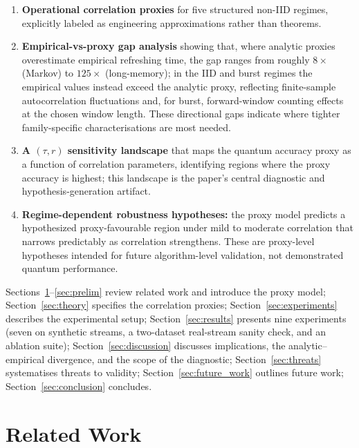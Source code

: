 \documentclass[sensors,article,submit,pdftex,moreauthors]{Definitions/mdpi}
\begin{document}
\begin{enumerate}
    \item \textbf{Operational correlation proxies} for five structured non\nobreakdash-IID regimes, explicitly labeled as engineering approximations rather than theorems.

    \item \textbf{Empirical-vs-proxy gap analysis} showing that, where analytic proxies overestimate empirical refreshing time, the gap ranges from roughly $8\times$ (Markov) to $125\times$ (long-memory); in the IID and burst regimes the empirical values instead exceed the analytic proxy, reflecting finite\nobreakdash-sample autocorrelation fluctuations and, for burst, forward\nobreakdash-window counting effects at the chosen window length. These directional gaps indicate where tighter family-specific characterisations are most needed.

    \item \textbf{A $(\tau, r)$ sensitivity landscape} that maps the quantum accuracy proxy as a function of correlation parameters, identifying regions where the proxy accuracy is highest; this landscape is the paper's central diagnostic and hypothesis-generation artifact.

    \item \textbf{Regime-dependent robustness hypotheses:} the proxy model predicts a hypothesized proxy-favourable region under mild to moderate correlation that narrows predictably as correlation strengthens. These are proxy-level hypotheses intended for future algorithm-level validation, not demonstrated quantum performance.
\end{enumerate}

Sections~\ref{sec:related}--\ref{sec:prelim} review related work and introduce the proxy model; Section~\ref{sec:theory} specifies the correlation proxies; Section~\ref{sec:experiments} describes the experimental setup; Section~\ref{sec:results} presents nine experiments (seven on synthetic streams, a two\nobreakdash-dataset real-stream sanity check, and an ablation suite); Section~\ref{sec:discussion} discusses implications, the analytic--empirical divergence, and the scope of the diagnostic; Section~\ref{sec:threats} systematises threats to validity; Section~\ref{sec:future_work} outlines future work; Section~\ref{sec:conclusion} concludes.


\section{Related Work}
\label{sec:related}
\end{document}
